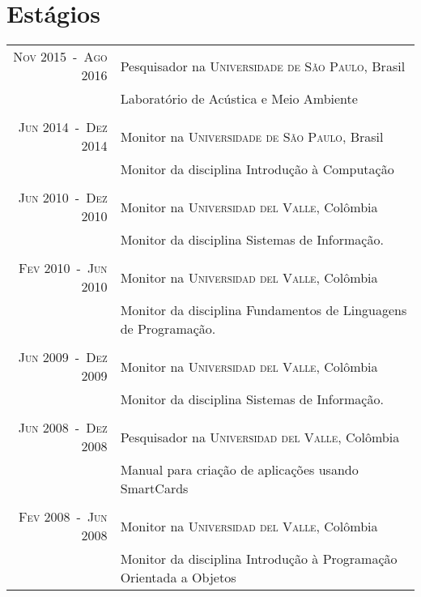 \documentclass[a4paper,10pt]{article}
\begin{document}
\section{Estágios}
\begin{longtable}{rl}

    \textsc{Nov 2015~-~Ago 2016}  & Pesquisador na \textsc{Universidade de São Paulo}, Brasil \\
                                  &\footnotesize{Laboratório de Acústica e Meio Ambiente} \\
                                  &\\

    \textsc{Jun 2014~-~Dez 2014}  & Monitor na \textsc{Universidade de São Paulo}, Brasil \\
                                  &\footnotesize{Monitor da disciplina Introdução à Computação} \\
                                  &\\

    \textsc{Jun 2010~-~Dez 2010}  & Monitor na \textsc{Universidad del Valle}, Colômbia \\
                                  &\footnotesize{Monitor da disciplina Sistemas de Informação.} \\
                                  &\\

    \textsc{Fev 2010~-~Jun 2010}  & Monitor na \textsc{Universidad del Valle}, Colômbia \\
                                  &\footnotesize{Monitor da disciplina Fundamentos de Linguagens de Programação.} \\
                                  &\\

    \textsc{Jun 2009~-~Dez 2009}  & Monitor na \textsc{Universidad del Valle}, Colômbia \\
                                  &\footnotesize{Monitor da disciplina Sistemas de Informação.} \\
                                  &\\

    \textsc{Jun 2008~-~Dez 2008}  & Pesquisador na \textsc{Universidad del Valle}, Colômbia \\
                                  &\footnotesize{Manual para criação de aplicações usando SmartCards} \\
                                  &\\

    \textsc{Fev 2008~-~Jun 2008}  & Monitor na \textsc{Universidad del Valle}, Colômbia \\
                                  &\footnotesize{Monitor da disciplina Introdução à Programação Orientada a Objetos} \\

\end{longtable}
\end{document}
